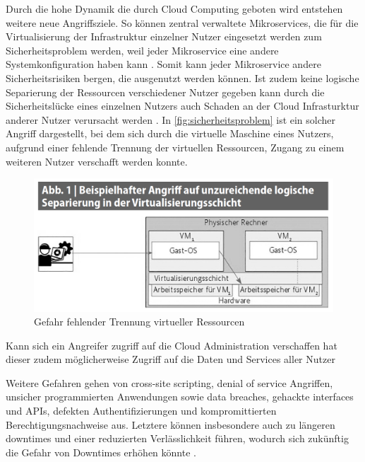 Durch die hohe Dynamik die durch Cloud Computing geboten wird entstehen weitere neue Angriffsziele. So können zentral verwaltete Mikroservices, die für die Virtualisierung der Infrastruktur einzelner Nutzer eingesetzt werden zum Sicherheitsproblem werden, weil jeder Mikroservice eine andere Systemkonfiguration haben kann \cite{chen2019}. Somit kann jeder Mikroservice andere Sicherheitsrisiken bergen, die ausgenutzt werden können. Ist zudem keine logische Separierung der Ressourcen verschiedener Nutzer gegeben kann durch die Sicherheitslücke eines einzelnen Nutzers auch Schaden an der Cloud Infrasturktur anderer Nutzer verursacht werden \cite{wehrhahn-aklender2019}. In \autoref{fig:sicherheitsproblem} ist ein solcher Angriff dargestellt, bei dem sich durch die virtuelle Maschine eines Nutzers, aufgrund einer fehlende Trennung der virtuellen Ressourcen, Zugang zu einem weiteren Nutzer verschafft werden konnte. 

\begin{figure}[b]
	\centering
	\includegraphics[width=\linewidth]{images/sicherheitsproblem.png}	
	\caption{Gefahr fehlender Trennung virtueller Ressourcen}
	\label{fig:sicherheitsproblem}
\end{figure}

 Kann sich ein Angreifer zugriff auf die Cloud Administration verschaffen hat dieser zudem möglicherweise Zugriff auf die Daten und Services aller Nutzer \cite{wehrhahn-aklender2019}

Weitere Gefahren gehen von cross-site scripting, denial of service Angriffen, 
unsicher programmierten Anwendungen sowie 
data breaches, gehackte interfaces und APIs, defekten Authentifizierungen 
und kompromittierten Berechtigungsnachweise aus. 
Letztere können insbesondere auch zu längeren downtimes und einer reduzierten Verlässlichkeit führen, 
wodurch sich zukünftig die Gefahr von Downtimes erhöhen könnte \cite{jabbar2020}.

